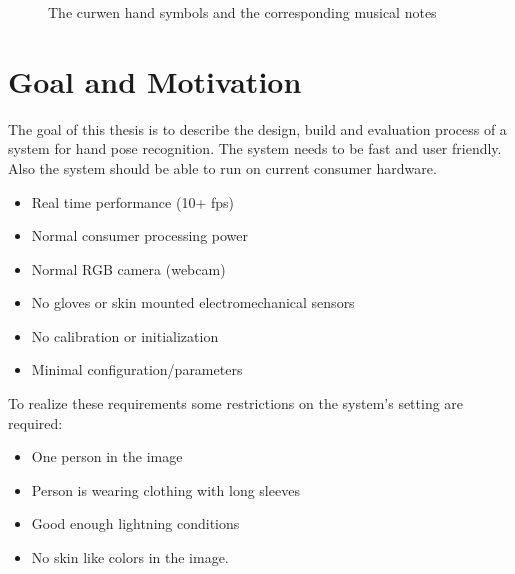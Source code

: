 \begin{figure}[htbp]
	\center{}
	\hspace{0.03\linewidth}
	\caption{The curwen hand symbols and the corresponding musical notes}
	\label{fig:curwennotes}
\end{figure}


\section{Goal and Motivation}
\label{sec:goal}
The goal of this thesis is to describe the design, build and evaluation process of a system for hand pose recognition. The system needs to be fast and user friendly. Also the system should be able to run on current consumer hardware.

\begin{itemize}
	\item Real time performance (10+ fps)
	\item Normal consumer processing power
	\item Normal RGB camera (webcam)
	\item No gloves or skin mounted electromechanical sensors
	\item No calibration or initialization
	\item Minimal configuration/parameters
\end{itemize}
	

To realize these requirements some restrictions on the system's setting are required:
\begin{itemize}
	\item One person in the image
	\item Person is wearing clothing with long sleeves
	\item Good enough lightning conditions
	\item No skin like colors in the image.
\end{itemize}

